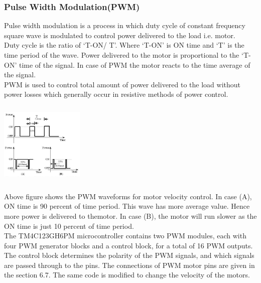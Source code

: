 \documentclass[a4paper,12pt,oneside]{article}
\begin{document}
			\subsubsection{\textbf{Pulse Width Modulation(PWM)}}
				Pulse width modulation is a process in which duty cycle of constant frequency square wave is modulated to control power delivered to the load i.e. motor. \\
				Duty cycle is the ratio of ‘T-ON/ T’. Where ‘T-ON’ is ON time and ‘T’ is the time period of the wave. Power delivered to the motor is proportional to the ‘T-ON’ time of the signal. In case of PWM the motor reacts to the time average of the signal. \\
				PWM is used to control total amount of power delivered to the load without power losses which generally occur in resistive methods of power control. 
				\begin{center}
					\includegraphics[width=4cm, height=4cm]{PWM}
				\end{center}
				Above figure shows the PWM waveforms for motor velocity control. In case (A), ON time is
				90 percent of time period. This wave has more average value. Hence more power is delivered to themotor. In case (B), the motor will run slower as the ON time is just 10 percent of time period. \\
				
				\hspace{-.7cm}
				The TM4C123GH6PM microcontroller contains two PWM modules, each with four PWM generator blocks and a control block, for a total of 16 PWM outputs. The control block determines the polarity of the PWM signals, and which signals are passed through to the pins. The connections of PWM motor pins are given in the section 6.7. The same code is modified to change the velocity of the motors.
				
\end{document}
